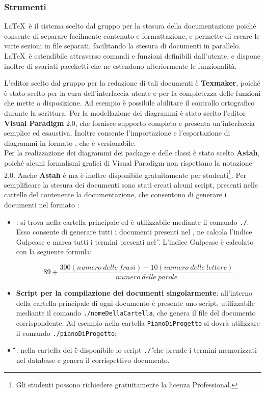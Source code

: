 \subsubsection{Strumenti}
\LaTeX\ è il sistema scelto dal gruppo per la stesura della documentazione poiché consente di separare facilmente contenuto e formattazione, e permette di creare le varie sezioni in file separati, facilitando la stesura di documenti in parallelo. \LaTeX\ è estendibile attraverso comandi e funzioni definibili dall'utente, e dispone inoltre di svariati pacchetti che ne estendono ulteriormente le funzionalità.\par
L'editor scelto dal gruppo per la redazione di tali documenti è \textbf{Texmaker}, poiché è stato scelto per la cura dell'interfaccia utente e per la completezza delle funzioni che mette a disposizione. Ad esempio è possibile abilitare il controllo ortografico durante la scrittura.
\label{editoruml}
Per la modellazione dei diagrammi  è stato scelto l'editor  \textbf{Visual Paradigm} 2.0, che fornisce supporto completo e presenta un'interfaccia semplice ed esaustiva.
Inoltre consente l'importazione e l'esportazione di diagrammi in formato , che è versionabile.\\
Per la realizzazione dei diagrammi dei package e delle classi è stato scelto \textbf{Astah}, poiché alcuni formalismi grafici di Visual Paradigm non rispettano la notazione  2.0. Anche \textbf{Astah} è  ma è inoltre disponibile gratuitamente per studenti\footnote{Gli studenti possono richiedere gratuitamente la licenza Professional.}.
\label{scriptlatex}
Per semplificare la stesura dei documenti sono stati creati alcuni script, presenti nelle cartelle del  contenente la documentazione, che consentono di generare i documenti nel formato :
\begin{itemize}
\item \textbf{\pragmaDocs}: si trova nella cartella principale ed è utilizzabile mediante il comando \texttt{./\pragmaDocs}. Esso consente di generare tutti i documenti presenti nel , ne calcola l'indice Gulpease e marca tutti i termini presenti nel \G . L'indice Gulpease è calcolato con la seguente formula:\par
\[89+\frac{300(numero~delle~frasi)-10(numero~delle~lettere)}{numero~delle~parole}\]
\item \textbf{Script per la compilazione dei documenti singolarmente}: all'interno della cartella principale di ogni documento è presente uno script, utilizzabile mediante il comando \texttt{./nomeDellaCartella}, che genera il file  del documento corrispondente. Ad esempio nella cartella \texttt{PianoDiProgetto} si dovrà utilizzare il comando \texttt{./pianoDiProgetto};
\item \textbf{\G}: nella cartella del \G è disponibile lo script \texttt{./\G} che prende i termini memorizzati nel database \pragmadb e genera il corrispettivo documento.
\end{itemize}
